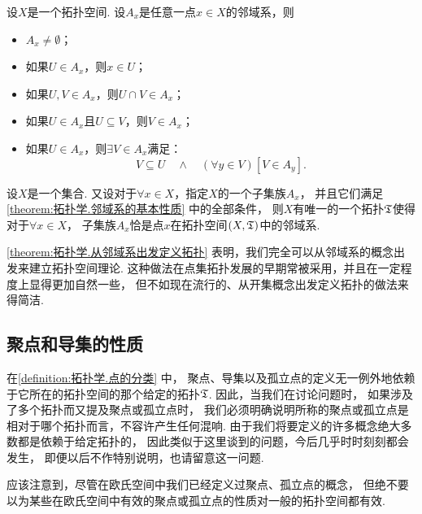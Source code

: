\begin{theorem}\label{theorem:拓扑学.邻域系的基本性质}
设\(X\)是一个拓扑空间.
设\(A_x\)是任意一点\(x \in X\)的邻域系，则
\begin{itemize}
	\item \(A_x \neq \emptyset\)；
	\item 如果\(U \in A_x\)，则\(x \in U\)；
	\item 如果\(U,V \in A_x\)，则\(U \cap V \in A_x\)；
	\item 如果\(U \in A_x\)且\(U \subseteq V\)，则\(V \in A_x\)；
	\item 如果\(U \in A_x\)，则\(\exists V \in A_x\)满足：\begin{equation*}
		V \subseteq U
		\quad\land\quad
		(\forall y \in V)
		[V \in A_y].
	\end{equation*}
\end{itemize}
\end{theorem}

\begin{theorem}\label{theorem:拓扑学.从邻域系出发定义拓扑}
设\(X\)是一个集合.
又设对于\(\forall x \in X\)，指定\(X\)的一个子集族\(A_x\)，
并且它们满足\cref{theorem:拓扑学.邻域系的基本性质} 中的全部条件，
则\(X\)有唯一的一个拓扑\({\mathfrak T}\)使得对于\(\forall x \in X\)，
子集族\(A_x\)恰是点\(x\)在拓扑空间\((X,{\mathfrak T})\)中的邻域系.
\end{theorem}

\cref{theorem:拓扑学.从邻域系出发定义拓扑}
表明，我们完全可以从邻域系的概念出发来建立拓扑空间理论.
这种做法在点集拓扑发展的早期常被采用，并且在一定程度上显得更加自然一些，
但不如现在流行的、从开集概念出发定义拓扑的做法来得简洁.

\subsection{聚点和导集的性质}
在\cref{definition:拓扑学.点的分类} 中，
聚点、导集以及孤立点的定义无一例外地依赖于它所在的拓扑空间的那个给定的拓扑\({\mathfrak T}\).
因此，当我们在讨论问题时，
如果涉及了多个拓扑而又提及聚点或孤立点时，
我们必须明确说明所称的聚点或孤立点是相对于哪个拓扑而言，不容许产生任何混响.
由于我们将要定义的许多概念绝大多数都是依赖于给定拓扑的，
因此类似于这里谈到的问题，今后几乎时时刻刻都会发生，
即便以后不作特别说明，也请留意这一问题.

应该注意到，尽管在欧氏空间中我们已经定义过聚点、孤立点的概念，
但绝不要以为某些在欧氏空间中有效的聚点或孤立点的性质对一般的拓扑空间都有效.

